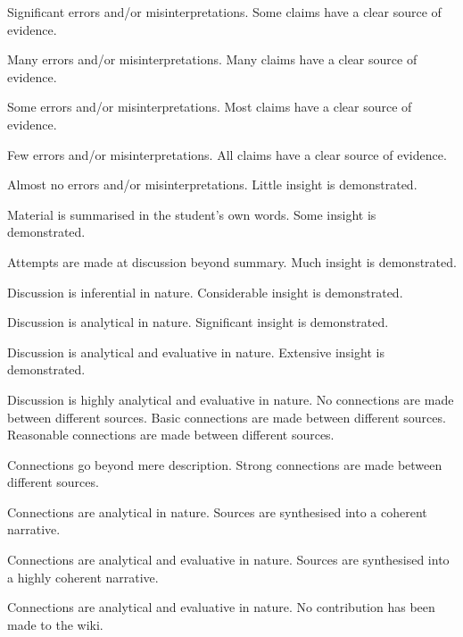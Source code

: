 \documentclass{../../fal_assignment}
\begin{document}
\begin{markingrubric}
        \par 		Significant errors and/or misinterpretations.
        \grade 		Some claims have a clear source of evidence.
        \par 		Many errors and/or misinterpretations.
        \grade 		Many claims have a clear source of evidence.
        \par 		Some errors and/or misinterpretations.
        \grade 		Most claims have a clear source of evidence.
        \par 		Few errors and/or misinterpretations.
        \grade 		All claims have a clear source of evidence.
        \par 		Almost no errors and/or misinterpretations.
%
        \grade\fail Little insight is demonstrated.
        \par		Material is summarised in the student's own words.
        \grade		Some insight is demonstrated.
        \par		Attempts are made at discussion beyond summary.
        \grade		Much insight is demonstrated.
        \par		Discussion is inferential in nature.
        \grade		Considerable insight is demonstrated.
        \par		Discussion is analytical in nature.
        \grade		Significant insight is demonstrated.
        \par		Discussion is analytical and evaluative in nature.
        \grade		Extensive insight is demonstrated.
        \par		Discussion is highly analytical and evaluative in nature.
%
        \grade\fail No connections are made between different sources.
        \grade		Basic connections are made between different sources.
        \grade		Reasonable connections are made between different sources.
        \par		Connections go beyond mere description.
        \grade		Strong connections are made between different sources.
        \par		Connections are analytical in nature.
        \grade		Sources are synthesised into a coherent narrative.
        \par		Connections are analytical and evaluative in nature.
        \grade		Sources are synthesised into a highly coherent narrative.
        \par		Connections are analytical and evaluative in nature.
%
        \grade\fail 	No contribution has been made to the wiki.

\end{markingrubric}
\end{document}
